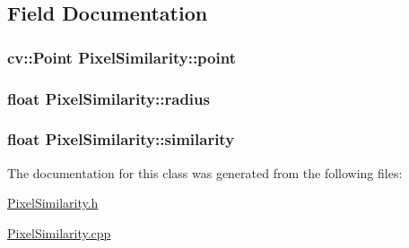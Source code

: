 \subsection{Field Documentation}
\hypertarget{classPixelSimilarity_a98e029104a5ee11b23554b02d7ac30e6}{
\subsubsection[{point}]{\setlength{\rightskip}{0pt plus 5cm}cv\-::\-Point Pixel\-Similarity\-::point}}\label{classPixelSimilarity_a98e029104a5ee11b23554b02d7ac30e6}
\hypertarget{classPixelSimilarity_a4da3847fd0812a4c4fc415a20697acf4}{
\subsubsection[{radius}]{\setlength{\rightskip}{0pt plus 5cm}float Pixel\-Similarity\-::radius}}\label{classPixelSimilarity_a4da3847fd0812a4c4fc415a20697acf4}
\hypertarget{classPixelSimilarity_a4fa484885e6d7d38078c6d75e4f4d72e}{
\subsubsection[{similarity}]{\setlength{\rightskip}{0pt plus 5cm}float Pixel\-Similarity\-::similarity}}\label{classPixelSimilarity_a4fa484885e6d7d38078c6d75e4f4d72e}


The documentation for this class was generated from the following files\-:\begin{DoxyCompactItemize}
\item 
\hyperlink{PixelSimilarity_8h}{Pixel\-Similarity.\-h}\item 
\hyperlink{PixelSimilarity_8cpp}{Pixel\-Similarity.\-cpp}\end{DoxyCompactItemize}
